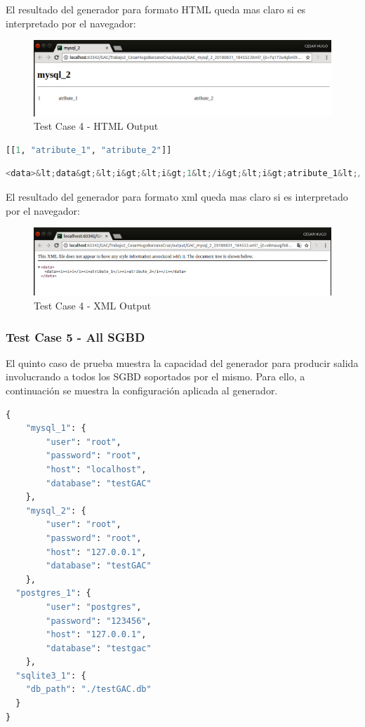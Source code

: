 \documentclass[a4paper,11pt]{book}
\begin{document}
El resultado del generador para formato HTML queda mas claro si es interpretado por el navegador: 

\begin{figure}[H]  
\centering 
\includegraphics[scale=0.35]{imagenes/TestCase4_html.png}
\caption{ Test Case 4 - HTML Output }  
\end{figure} 


\begin{lstlisting}[language=python,caption={Formato Json }]
[[1, "atribute_1", "atribute_2"]]
\end{lstlisting}


\begin{lstlisting}[language=python,caption={Formato XML }]
<data>&lt;data&gt;&lt;i&gt;&lt;i&gt;1&lt;/i&gt;&lt;i&gt;atribute_1&lt;/i&gt;&lt;i&gt;atribute_2&lt;/i&gt;&lt;/i&gt;&lt;/data&gt;</data>
\end{lstlisting}

El resultado del generador para formato xml queda mas claro si es interpretado por el navegador: 

\begin{figure}[H]  
\centering 
\includegraphics[scale=0.35]{imagenes/TestCase4_xml.png}
\caption{ Test Case 4 - XML Output }  
\end{figure} 

\subsubsection{Test Case 5 - All SGBD}

El quinto caso de prueba muestra la capacidad del generador para producir salida involucrando a todos los SGBD soportados por el mismo. Para ello, a continuación se muestra la configuración aplicada al generador. 

\begin{lstlisting}[language=python,caption={GAC\_GENERATOR\_CONFIG\_5.json }]
 {
	"mysql_1": {
		"user": "root",
		"password": "root",
		"host": "localhost",
		"database": "testGAC"
	},
	"mysql_2": {
		"user": "root",
		"password": "root",
		"host": "127.0.0.1",
		"database": "testGAC"
	},
  "postgres_1": {
		"user": "postgres",
		"password": "123456",
		"host": "127.0.0.1",
		"database": "testgac"
	},
  "sqlite3_1": {
    "db_path": "./testGAC.db"
  }
}
\end{lstlisting}
\end{document}
